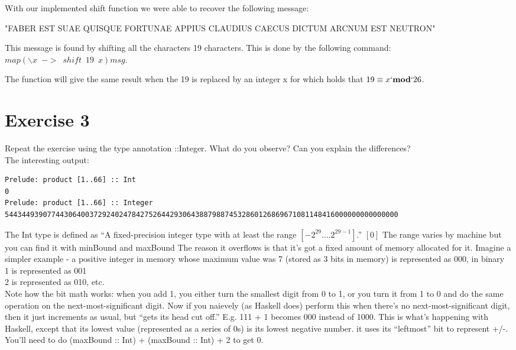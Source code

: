 \documentclass{article}
\begin{document}
With our implemented shift function we were able to recover the following message:

"FABER EST SUAE QUISQUE FORTUNAE APPIUS CLAUDIUS CAECUS DICTUM ARCNUM EST NEUTRON"

This message is found by shifting all the characters 19 characters. This is done by the following command:
$map (\backslash x \enspace -> \enspace shift \enspace 19 \enspace x)msg$.

The function will give the same result when the 19 is replaced by an integer x for which holds that $19 \equiv x `\textbf{mod}` 26$.

\newpage
\section*{Exercise 3}
Repeat the exercise using the type annotation ::Integer. What do you observe? Can you explain the differences?\\
\newline
The interesting output:
\begin{lstlisting}
Prelude: product [1..66] :: Int
0
Prelude: product [1..66] :: Integer
544344939077443064003729240247842752644293064388798874532860126869671081148416000000000000000
\end{lstlisting}
The Int type is defined as ``A fixed-precision integer type with at least the range $[-2^{29} \dots. 2^{29-1}]$.'' $[0]$ The range varies by machine but you can find it with minBound and maxBound
\newline
The reason it overflows is that it's got a fixed amount of memory allocated for it. Imagine a simpler example - a positive integer in memory whose maximum value was 7 (stored as 3 bits in memory)
\newline
{} is represented as 000, in binary\\
1 is represented as 001\\
2 is represented as 010, etc.\\
\newline
Note how the bit math works: when you add 1, you either turn the smallest digit from 0 to 1, or you turn it from 1 to 0 and do the same operation on the next-most-significant digit.
\newline
\newline
Now if you naievely (as Haskell does) perform this when there's no next-most-significant digit, then it just increments as usual, but ``gets its head cut off.'' E.g. 111 + 1 becomes 000 instead of 1000. This is what's happening with Haskell, except that its lowest value (represented as a series of 0s) is its lowest negative number. it uses its ``leftmost'' bit to represent +/-. You'll need to do (maxBound :: Int) + (maxBound :: Int) + 2 to get 0.
\end{document}

